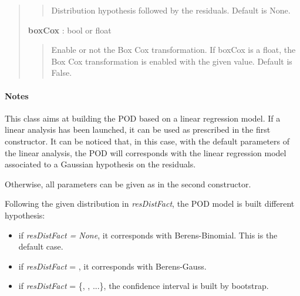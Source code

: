\documentclass[letterpaper,10pt,english]{sphinxmanual}
\begin{document}
\begin{fulllineitems}
\begin{quote}
\begin{description}
\begin{quote}
Distribution hypothesis followed by the residuals. Default is None.
\end{quote}

\textbf{boxCox} : bool or float
\begin{quote}

Enable or not the Box Cox transformation. If boxCox is a float, the Box
Cox transformation is enabled with the given value. Default is False.
\end{quote}

\end{description}\end{quote}
\paragraph{Notes}

This class aims at building the POD based on a linear regression
model. If a linear analysis has been launched, it can be used as prescribed 
in the first constructor. It can be noticed that, in this case, with the
default parameters of the linear analysis, the POD will corresponds with the
linear regression model associated to a Gaussian hypothesis on the residuals.

Otherwise, all parameters can be given as in the second constructor.

Following the given distribution in \emph{resDistFact}, the POD model is built
different hypothesis:
\begin{itemize}
\item {} 
if \emph{resDistFact = None}, it corresponds with Berens-Binomial. This
is the default case.

\item {} 
if \emph{resDistFact} = \href{http://doc.openturns.org/openturns-latest/sphinx/user\_manual/\_generated/openturns.NormalFactory.html\#openturns.NormalFactory}{}, it corresponds with Berens-Gauss.

\item {} 
if \emph{resDistFact} = \{\href{http://doc.openturns.org/openturns-latest/sphinx/user\_manual/\_generated/openturns.KernelSmoothing.html\#openturns.KernelSmoothing}{},
\href{http://doc.openturns.org/openturns-latest/sphinx/user\_manual/\_generated/openturns.WeibullFactory.html\#openturns.WeibullFactory}{}, ...\}, the confidence interval is
built by bootstrap.

\end{itemize}

\end{fulllineitems}
\end{document}
